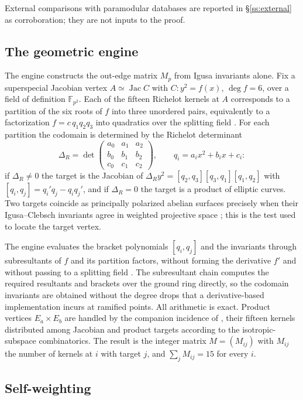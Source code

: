 \documentclass[11pt]{amsart}
\theoremstyle{plain}
\theoremstyle{definition}
\newcommand{\F}{\mathbb{F}}
\DeclareMathOperator{\Jac}{Jac}
\begin{document}
	External comparisons with paramodular databases are reported in
	\S\ref{ss:external} as corroboration; they are not inputs to the proof.
	
	\subsection{The geometric engine}
	\label{ss:engine}
	
	The engine constructs the out-edge matrix $M_p$ from Igusa invariants
	alone. Fix a superspecial Jacobian vertex $A\simeq\Jac C$ with
	$C:y^2=f(x)$, $\deg f=6$, over a field of definition $\F_{p^2}$. Each of
	the fifteen Richelot kernels at $A$ corresponds to a partition of the six
	roots of $f$ into three unordered pairs, equivalently to a factorization
	$f=c\,q_1q_2q_3$ into quadratics over the splitting field
	\cite[\S8]{JordanZaytman}. For each partition the codomain is determined by
	the Richelot determinant
	\[
	\Delta_R=\det\begin{pmatrix}a_0&a_1&a_2\\ b_0&b_1&b_2\\ c_0&c_1&c_2
	\end{pmatrix},
	\qquad q_i=a_ix^2+b_ix+c_i:
	\]
	if $\Delta_R\ne0$ the target is the Jacobian of
	$\Delta_R y^2=[q_2,q_3][q_3,q_1][q_1,q_2]$ with
	$[q_i,q_j]=q_i'q_j-q_iq_j'$, and if $\Delta_R=0$ the target is a product
	of elliptic curves. Two targets coincide as principally polarized abelian
	surfaces precisely when their Igusa--Clebsch invariants agree in weighted
	projective space \cite{Igusa1960}; this is the test used to locate the
	target vertex.
	
	The engine evaluates the bracket polynomials $[q_i,q_j]$ and the
	invariants through subresultants of $f$ and its partition factors, without
	forming the derivative $f'$ and without passing to a splitting field \cite{Dang2025}. The
	subresultant chain computes the required resultants and brackets over the
	ground ring directly, so the codomain invariants are obtained without the
	degree drops that a derivative-based implementation incurs at ramified
	points. All arithmetic is exact. Product vertices $E_a\times E_b$ are
	handled by the companion incidence of \cite{KatsuraTakashima}, their
	fifteen kernels distributed among Jacobian and product targets according to
	the isotropic-subspace combinatorics. The result is the integer matrix
	$M=(M_{ij})$ with $M_{ij}$ the number of kernels at $i$ with target $j$,
	and $\sum_jM_{ij}=15$ for every $i$.
	
	\subsection{Self-weighting}
	\label{ss:selfweight}
	
\end{document}
